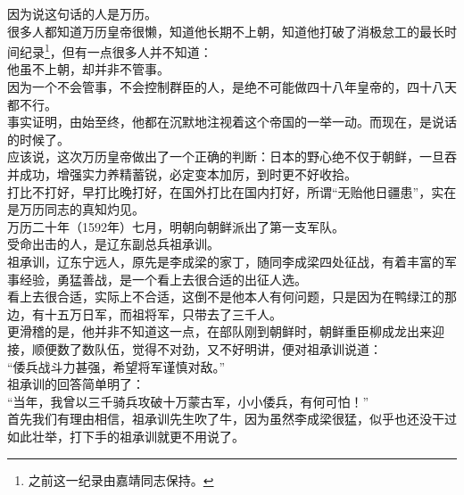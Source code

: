 \begin{multicols}{\theparacolNo}
因为说这句话的人是万历。\\

很多人都知道万历皇帝很懒，知道他长期不上朝，知道他打破了消极怠工的最长时间纪录\footnote{之前这一纪录由嘉靖同志保持。}，但有一点很多人并不知道：\\

他虽不上朝，却并非不管事。\\

因为一个不会管事，不会控制群臣的人，是绝不可能做四十八年皇帝的，四十八天都不行。\\

事实证明，由始至终，他都在沉默地注视着这个帝国的一举一动。而现在，是说话的时候了。\\

应该说，这次万历皇帝做出了一个正确的判断：日本的野心绝不仅于朝鲜，一旦吞并成功，增强实力养精蓄锐，必定变本加厉，到时更不好收拾。\\

打比不打好，早打比晚打好，在国外打比在国内打好，所谓“无贻他日疆患”，实在是万历同志的真知灼见。\\

万历二十年（1592年）七月，明朝向朝鲜派出了第一支军队。\\

受命出击的人，是辽东副总兵祖承训。\\

祖承训，辽东宁远人，原先是李成梁的家丁，随同李成梁四处征战，有着丰富的军事经验，勇猛善战，是一个看上去很合适的出征人选。\\

看上去很合适，实际上不合适，这倒不是他本人有何问题，只是因为在鸭绿江的那边，有十五万日军，而祖将军，只带去了三千人。\\

更滑稽的是，他并非不知道这一点，在部队刚到朝鲜时，朝鲜重臣柳成龙出来迎接，顺便数了数队伍，觉得不对劲，又不好明讲，便对祖承训说道：\\

“倭兵战斗力甚强，希望将军谨慎对敌。”\\

祖承训的回答简单明了：\\

“当年，我曾以三千骑兵攻破十万蒙古军，小小倭兵，有何可怕！”\\

首先我们有理由相信，祖承训先生吹了牛，因为虽然李成梁很猛，似乎也还没干过如此壮举，打下手的祖承训就更不用说了。\\


\end{multicols}
